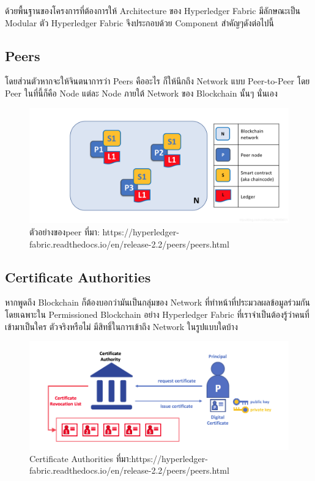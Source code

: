 ด้วยพื้นฐานของโครงการที่ต้องการให้ Architecture ของ Hyperledger Fabric มีลักษณะเป็น Modular ตัว Hyperledger Fabric จึงประกอบด้วย Component สำคัญๆดังต่อไปนี้
\subsection{Peers}
\cite{Hyperledger_a} 
 โดยส่วนตัวหากจะให้จินตนาการว่า Peers คืออะไร ก็ให้นึกถึง Network แบบ Peer-to-Peer โดย Peer ในที่นี้ก็คือ Node แต่ละ Node ภายใต้ Network ของ Blockchain นั้นๆ นั่นเอง
 \graphicspath{ {./images/} }
 \begin{figure}[htbp]
   \centering 
   \includegraphics[scale=0.2]{peer.png}
   \caption[Peer]{ตัวอย่างของpeer
   ที่มา: https://hyperledger-fabric.readthedocs.io/en/release-2.2/peers/peers.html}
   \label{fig:Peer}
 \end{figure}



\subsection{Certificate Authorities}
\cite{Hyperledger_a} 
หากพูดถึง Blockchain ก็ต้องบอกว่ามันเป็นกลุ่มของ Network ที่ทำหน้าที่ประมวลผลข้อมูลร่วมกัน โดยเฉพาะใน Permissioned Blockchain อย่าง Hyperledger Fabric ที่เราจำเป็นต้องรู้ว่าคนที่เข้ามาเป็นใคร ตัวจริงหรือไม่ มีสิทธิ์ในการเข้าถึง Network ในรูปแบบใดบ้าง
\graphicspath{ {./images/} }
\begin{figure}[htbp]
  \centering 
  \includegraphics[scale=0.5]{certifi.png}
  \caption[Certificate Authorities]{Certificate Authorities
  ที่มา:https://hyperledger-fabric.readthedocs.io/en/release-2.2/peers/peers.html}
  \label{fig:Certificate}
\end{figure}

